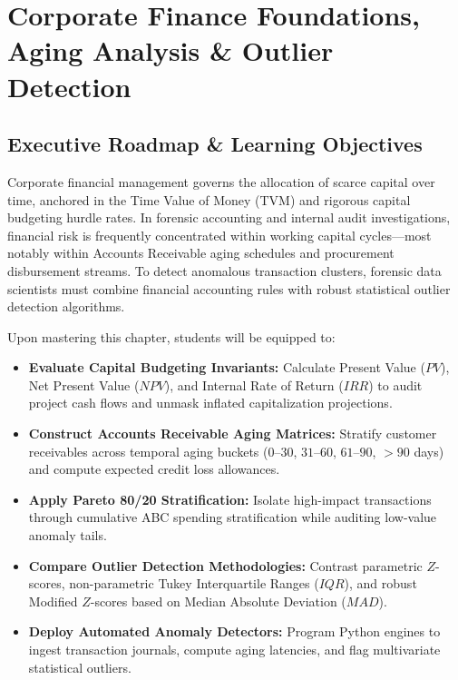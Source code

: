 \chapter{Corporate Finance Foundations, Aging Analysis \& Outlier Detection}

\section{Executive Roadmap \& Learning Objectives}

Corporate financial management governs the allocation of scarce capital over time, anchored in the Time Value of Money (TVM) and rigorous capital budgeting hurdle rates. In forensic accounting and internal audit investigations, financial risk is frequently concentrated within working capital cycles---most notably within Accounts Receivable aging schedules and procurement disbursement streams. To detect anomalous transaction clusters, forensic data scientists must combine financial accounting rules with robust statistical outlier detection algorithms.

\begin{tcolorbox}[colback=primarylight, colframe=primarydark, title={\textbf{Core Learning Competencies}}]
Upon mastering this chapter, students will be equipped to:
\begin{itemize}
    \item \textbf{Evaluate Capital Budgeting Invariants:} Calculate Present Value ($PV$), Net Present Value ($NPV$), and Internal Rate of Return ($IRR$) to audit project cash flows and unmask inflated capitalization projections.
    \item \textbf{Construct Accounts Receivable Aging Matrices:} Stratify customer receivables across temporal aging buckets ($0$--$30$, $31$--$60$, $61$--$90$, $>90$ days) and compute expected credit loss allowances.
    \item \textbf{Apply Pareto 80/20 Stratification:} Isolate high-impact transactions through cumulative ABC spending stratification while auditing low-value anomaly tails.
    \item \textbf{Compare Outlier Detection Methodologies:} Contrast parametric $Z$-scores, non-parametric Tukey Interquartile Ranges ($IQR$), and robust Modified $Z$-scores based on Median Absolute Deviation ($MAD$).
    \item \textbf{Deploy Automated Anomaly Detectors:} Program Python engines to ingest transaction journals, compute aging latencies, and flag multivariate statistical outliers.
\end{itemize}
\end{tcolorbox}

